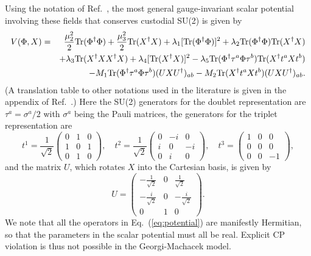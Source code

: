 \documentclass[11pt]{article}
\begin{document}
Using the notation of Ref.~\cite{HKL}, the most general gauge-invariant scalar potential involving these fields that conserves custodial SU(2) is given by
\begin{eqnarray}
	V(\Phi,X) &= & \frac{\mu_2^2}{2} {\rm Tr}(\Phi^\dagger \Phi) 
	+  \frac{\mu_3^2}{2}  {\rm Tr}(X^\dagger X)  
	+ \lambda_1 [{\rm Tr}(\Phi^\dagger \Phi)]^2  
	+ \lambda_2 {\rm Tr}(\Phi^\dagger \Phi) {\rm Tr}(X^\dagger X)   \nonumber \\
          & & + \lambda_3 {\rm Tr}(X^\dagger X X^\dagger X)  
          + \lambda_4 [{\rm Tr}(X^\dagger X)]^2 
           - \lambda_5 {\rm Tr}( \Phi^\dagger \tau^a \Phi \tau^b) {\rm Tr}( X^\dagger t^a X t^b) 
           \nonumber \\
           & & - M_1 {\rm Tr}(\Phi^\dagger \tau^a \Phi \tau^b)(U X U^\dagger)_{ab}  
           -  M_2 {\rm Tr}(X^\dagger t^a X t^b)(U X U^\dagger)_{ab}.
           \label{eq:potential}
\end{eqnarray} 
(A translation table to other notations used in the literature is given in the appendix of Ref.~\cite{HKL}.)
Here the SU(2) generators for the doublet representation are $\tau^a = \sigma^a/2$ with $\sigma^a$ being the Pauli matrices,
the generators for the triplet representation are
\begin{equation}
	t^1= \frac{1}{\sqrt{2}} \left( \begin{array}{ccc}
	 0 & 1  & 0  \\
	  1 & 0  & 1  \\
	  0 & 1  & 0 \end{array} \right), \quad  
	  t^2= \frac{1}{\sqrt{2}} \left( \begin{array}{ccc}
	 0 & -i  & 0  \\
	  i & 0  & -i  \\
	  0 & i  & 0 \end{array} \right), \quad 
	t^3= \left( \begin{array}{ccc}
	 1 & 0  & 0  \\
	  0 & 0  & 0  \\
	  0 & 0 & -1 \end{array} \right),
\end{equation}
and the matrix $U$, which rotates $X$ into the Cartesian basis, is given by
\begin{equation}
	 U = \left( \begin{array}{ccc}
	- \frac{1}{\sqrt{2}} & 0 &  \frac{1}{\sqrt{2}} \\
	 - \frac{i}{\sqrt{2}} & 0  &   - \frac{i}{\sqrt{2}} \\
	   0 & 1 & 0 \end{array} \right).
	 \label{eq:U}
\end{equation}
We note that all the operators in Eq.~(\ref{eq:potential}) are manifestly Hermitian, so that the parameters in the scalar potential must all be real.  Explicit CP violation is thus not possible in the Georgi-Machacek model.  
\end{document}
